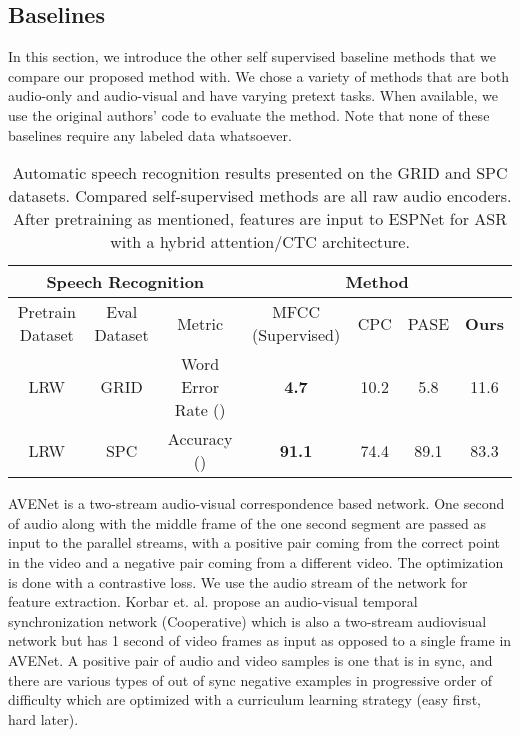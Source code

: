 \documentclass{article}
\begin{document}
\subsection{Baselines}
In this section, we introduce the other self supervised baseline methods that we compare our proposed method with. We chose a variety of methods that are both audio-only and audio-visual and have varying pretext tasks. When available, we use the original authors' code to evaluate the method. Note that none of these baselines require any labeled data whatsoever.

\begin{table*}[t]
\small
    \centering
    \begin{tabular}{|c|c|c|c|c|c|c|}
\hline
\multicolumn{3}{|c|}{\textbf{Speech Recognition}} & \multicolumn{4}{c|}{Method}                                    \\ \hline
Pretrain Dataset               & Eval Dataset & Metric & MFCC (Supervised)             &  CPC \cite{oord2018representation} & PASE \cite{pascual2019learning} & \textbf{Ours} \\ \hline
LRW                         & GRID               & Word Error Rate ()  &  \textbf{4.7} & 10.2     & 5.8     & 11.6  \\ 
LRW                   & SPC             &   Accuracy  ()  & \textbf{91.1} &   74.4       & 89.1     & 83.3  \\
\hline

\end{tabular}
    \caption{Automatic speech recognition results presented on the GRID and SPC datasets. Compared self-supervised methods are all raw audio encoders. After pretraining as mentioned,  features are input to ESPNet for ASR with a hybrid attention/CTC architecture.}
    \label{tab:speech}
\end{table*}


AVENet \cite{arandjelovic2018objects} is a two-stream audio-visual correspondence based network. One second of audio along with the middle frame of the one second segment are passed as input to the parallel streams, with a positive pair coming from the correct point in the video and a negative pair coming from a different video. The optimization is done with a contrastive loss. We use the audio stream of the network for feature extraction. Korbar et. al. \cite{korbar2018cooperative} propose an audio-visual temporal synchronization network (Cooperative) which is also a two-stream audiovisual network but has 1 second of video frames as input as opposed to a single frame in AVENet. A positive pair of audio and video samples is one that is in sync, and there are various types of out of sync negative examples in progressive order of difficulty which are optimized with a curriculum learning strategy (easy first, hard later).
\end{document}
